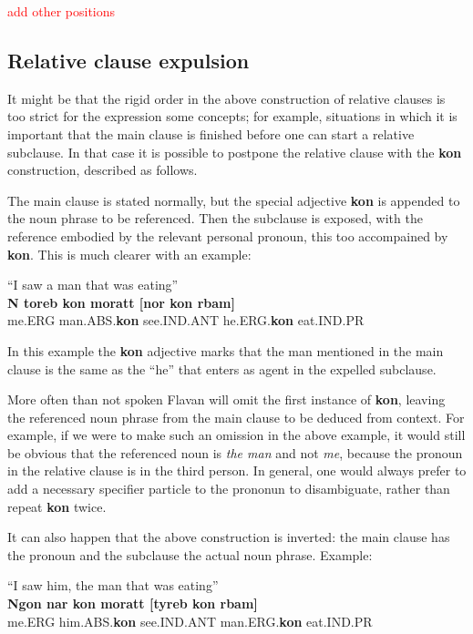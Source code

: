 \documentclass[10pt,oneside]{memoir}
\newcommand{\cmmnt}[1]{\textcolor{red}{#1}}
\begin{document}
\cmmnt{add other positions}

\subsection{Relative clause expulsion}

It might be that the rigid order in the above construction of relative clauses is too strict for the expression some concepts; for example, situations in which it is important that the main clause is finished before one can start a relative subclause. In that case it is possible to postpone the relative clause with the \textbf{kon} construction, described as follows.

The main clause is stated normally, but the special adjective \textbf{kon} is appended to the noun phrase to be referenced. Then the subclause is exposed, with the reference embodied by the relevant personal pronoun, this too accompained by \textbf{kon}. This is much clearer with an example:

\begin{center}
    ``I saw a man that was eating''\\
    \textbf{N toreb kon moratt [nor kon rbam]}\\
    me.ERG man.ABS.\textbf{kon} see.IND.ANT he.ERG.\textbf{kon} eat.IND.PR
\end{center}

In this example the \textbf{kon} adjective marks that the man mentioned in the main clause is the same as the ``he'' that enters as agent in the expelled subclause.

More often than not spoken Flavan will omit the first instance of \textbf{kon}, leaving the referenced noun phrase from the main clause to be deduced from context. For example, if we were to make such an omission in the above example, it would still be obvious that the referenced noun is \emph{the man} and not \emph{me}, because the pronoun in the relative clause is in the third person. In general, one would always prefer to add a necessary specifier particle to the prononun to disambiguate, rather than repeat \textbf{kon} twice.

It can also happen that the above construction is inverted: the main clause has the pronoun and the subclause the actual noun phrase. Example:

\begin{center}
    ``I saw him, the man that was eating''\\
    \textbf{Ngon nar kon moratt [tyreb kon rbam]}\\
    me.ERG him.ABS.\textbf{kon} see.IND.ANT man.ERG.\textbf{kon} eat.IND.PR
\end{center}
\end{document}
